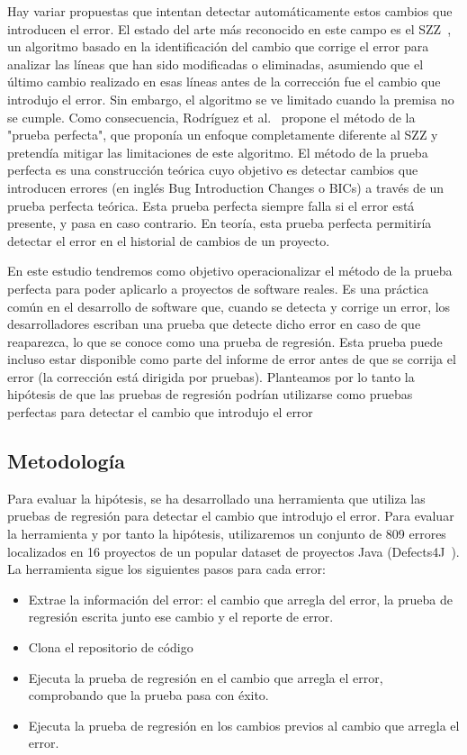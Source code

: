 Hay variar propuestas que intentan detectar automáticamente estos cambios que introducen el error. 
El estado del arte más reconocido en este campo es el SZZ~\cite{sliwerski2005changes}, un algoritmo basado en la identificación del cambio que corrige el error para analizar las líneas que han sido modificadas o eliminadas, asumiendo que el último cambio realizado en esas líneas antes de la corrección fue el cambio que introdujo el error.
Sin embargo, el algoritmo se ve limitado cuando la premisa no se cumple.
Como consecuencia, Rodríguez et al.~\cite{rodriguez2020bugs} propone el método de la "prueba perfecta", que proponía un enfoque completamente diferente al SZZ y pretendía mitigar las limitaciones de este algoritmo. 
El método de la prueba perfecta es una construcción teórica cuyo objetivo es detectar cambios que introducen errores (en inglés
Bug Introduction Changes o BICs) a través de un prueba perfecta teórica.
Esta prueba perfecta siempre falla si el error está presente, y pasa en caso contrario. En teoría, esta prueba perfecta permitiría detectar el error en el historial de cambios de un proyecto.

En este estudio tendremos como objetivo operacionalizar el método de la prueba perfecta para poder aplicarlo a proyectos de software reales.
Es una práctica común en el desarrollo de software que, cuando se detecta y corrige un error, los desarrolladores escriban una
prueba que detecte dicho error en caso de que reaparezca, lo que se conoce como una prueba de regresión. 
Esta prueba puede incluso estar disponible como parte del informe de error antes de que se corrija el error (la corrección está dirigida por pruebas).
Planteamos por lo tanto la hipótesis de que las pruebas de regresión podrían utilizarse como pruebas perfectas para detectar el cambio que introdujo el error

\subsection{Metodología}

Para evaluar la hipótesis, se ha desarrollado una herramienta que utiliza las pruebas de regresión para detectar el cambio que introdujo el error.
Para evaluar la herramienta y por tanto la hipótesis, utilizaremos un conjunto de 809 errores localizados en 16 proyectos de un popular dataset de proyectos Java (Defects4J~\cite{just2014defects4j}).
La herramienta sigue los siguientes pasos para cada error:
\begin{itemize}
    \item Extrae la información del error: el cambio que arregla del error, la prueba de regresión escrita junto ese cambio y el reporte de error.
    \item Clona el repositorio de código
    \item Ejecuta la prueba de regresión en el cambio que arregla el error, comprobando que la prueba pasa con éxito.
    \item Ejecuta la prueba de regresión en los cambios previos al cambio que arregla el error. 
\end{itemize}

